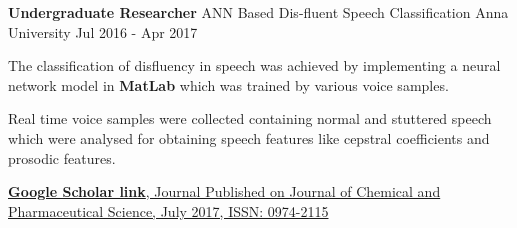 \begin{cventries}
\vspace{0.3cm}
\cventry
    {\textbf{Undergraduate Researcher}}
    {ANN Based Dis-fluent Speech Classification}
    {Anna University}
    {Jul 2016 - Apr 2017}
    {
     \begin{cvitems} %
        \normalsize{\item {The classification of disfluency in speech was achieved by implementing a neural network model in \textbf{MatLab} which was trained by various voice samples.}
        \item{Real time voice samples were collected containing normal and stuttered speech which were analysed for obtaining speech features like cepstral coefficients and prosodic features.}
        \item{\href{https://www.jchps.com/specialissues/2017\%20Special\%20Issue\%2011/EC1766.pdf}{\textbf{Google Scholar link}, Journal Published on Journal of Chemical and Pharmaceutical Science, July 2017, ISSN: 0974-2115}}}
      \end{cvitems}
    }

\end{cventries}


